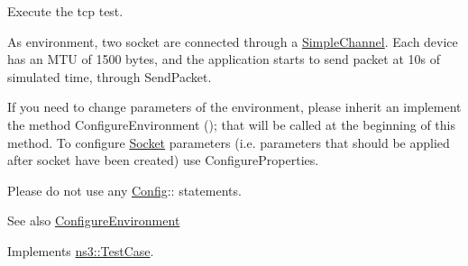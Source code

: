 Execute the tcp test. 

As environment, two socket are connected through a \hyperlink{classns3_1_1SimpleChannel}{Simple\+Channel}. Each device has an M\+TU of 1500 bytes, and the application starts to send packet at 10s of simulated time, through Send\+Packet.

If you need to change parameters of the environment, please inherit an implement the method Configure\+Environment (); that will be called at the beginning of this method. To configure \hyperlink{classns3_1_1Socket}{Socket} parameters (i.\+e. parameters that should be applied after socket have been created) use Configure\+Properties.

Please do not use any \hyperlink{namespacens3_1_1Config}{Config}\+:\+: statements.

\begin{DoxySeeAlso}{See also}
\hyperlink{classns3_1_1TcpGeneralTest_abd4e42807a8d2b13dcd207131af12c3b}{Configure\+Environment} 
\end{DoxySeeAlso}


Implements \hyperlink{classns3_1_1TestCase_a8ff74680cf017ed42011e4be51917a24}{ns3\+::\+Test\+Case}.


